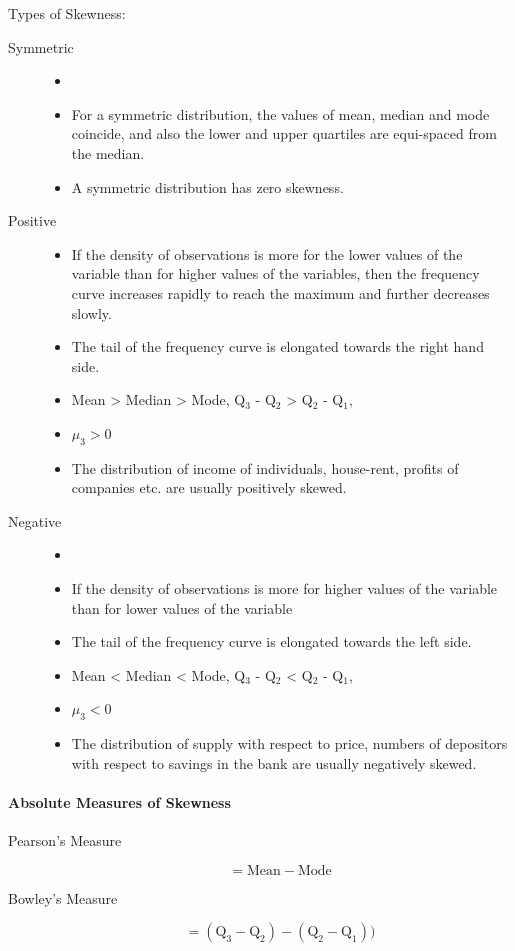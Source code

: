 \documentclass[
10pt, %
a4paper, %
]{report}
\begin{document}
\begin{itemize}
Types of Skewness:
\begin{description}
\item[Symmetric]
\begin{itemize}
\item[]
\item For a symmetric distribution, the values of mean, median and mode coincide, and also the lower and upper quartiles are equi-spaced from the median.
\item A symmetric distribution has zero skewness.
\end{itemize}
\item[Positive]
\begin{itemize}
\item If the density of observations is more for the lower values of the variable than for higher values of the variables, then the frequency curve increases rapidly to reach the maximum and further decreases slowly.
\item The tail of the frequency curve is elongated towards the right hand side.
\item Mean > Median > Mode, Q\(_3\) - Q\(_2\) > Q\(_2\) - Q\(_1\),
\item \(\mu_3 > 0\)
\item The distribution of income of individuals, house-rent, profits of companies etc. are usually positively skewed.
\end{itemize}
\item[Negative]
\begin{itemize}
\item[]
\item If the density of observations is more for higher values of the variable than for lower values of the variable
\item The tail of the frequency curve is elongated towards the left side.
\item Mean < Median < Mode, Q\(_3\) - Q\(_2\) < Q\(_2\) - Q\(_1\),
\item \(\mu_3 < 0\)
\item The distribution of supply with respect to price, numbers of depositors with respect to savings in the bank are usually negatively skewed.
\end{itemize}
\end{description}
\end{itemize}

\paragraph*{Absolute Measures of Skewness}
\begin{description}
\item[Pearson's Measure]
\[ = \text{Mean} - \text{Mode} \]
\item[Bowley's Measure]
\[ = (\mathrm{Q}_3 - \mathrm{Q}_2) - (\mathrm{Q}_2 - \mathrm{Q}_1)) \]
\end{description}
\end{document}
